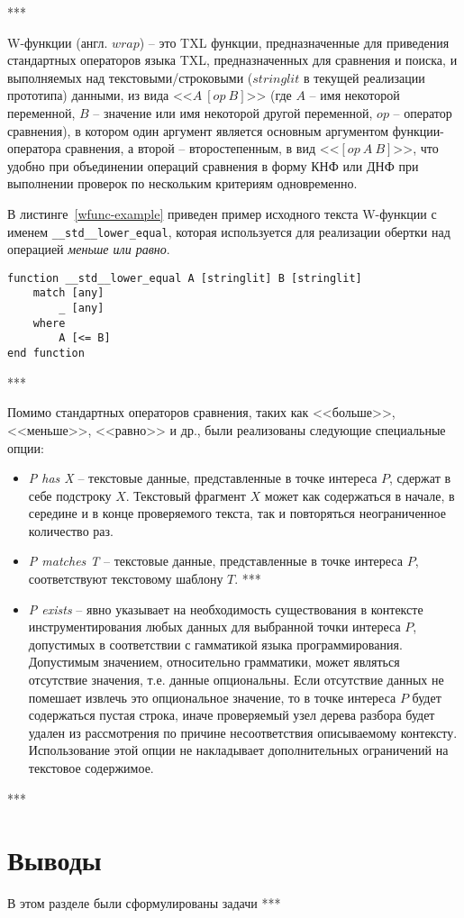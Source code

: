 ***

W-функции (англ. $wrap$) -- это TXL функции, предназначенные для приведения стандартных операторов языка TXL, предназначенных для сравнения и поиска, и выполняемых над текстовыми/строковыми ($stringlit$ в текущей реализации прототипа) данными, из вида <<$A~[op~B]$>> (где $A$ -- имя некоторой переменной, $B$ -- значение или имя некоторой другой переменной, $op$ -- оператор сравнения), в котором один аргумент является основным аргументом функции-оператора сравнения, а второй -- второстепенным, в вид <<$[op~A~B]$>>, что удобно при объединении операций сравнения в форму КНФ или ДНФ при выполнении проверок по нескольким критериям одновременно.

В листинге~\ref{wfunc-example} приведен пример исходного текста W-функции с именем \lstinline{__std__lower_equal}, которая используется для реализации обертки над операцией \textit{меньше или равно}.

\begin{lstlisting}[frame=single, language=TXL, label={wfunc-example}, caption={Пример W-функции}]
function __std__lower_equal A [stringlit] B [stringlit]
	match [any]
		_ [any]
	where
		A [<= B]
end function
\end{lstlisting}

***

Помимо стандартных операторов сравнения, таких как <<больше>>, <<меньше>>, <<равно>> и др., были реализованы следующие специальные опции:
\begin{itemize}[noitemsep]
  \item \textit{P has X} --
  текстовые данные, представленные в точке интереса $P$, сдержат в себе подстроку $X$. Текстовый фрагмент $X$ может как содержаться в начале, в середине и в конце проверяемого текста, так и повторяться неограниченное количество раз.

  \item \textit{P matches T} --
  текстовые данные, представленные в точке интереса $P$, соответствуют текстовому шаблону $T$. ***

  \item \textit{P exists} --
  явно указывает на необходимость существования в контексте инструментирования любых данных для выбранной точки интереса $P$, допустимых в соответствии с гамматикой языка программирования. Допустимым значением, относительно грамматики, может являться отсутствие значения, т.е. данные опциональны. Если отсутствие данных не помешает извлечь это опциональное значение, то в точке интереса $P$ будет содержаться пустая строка, иначе проверяемый узел дерева разбора будет удален из рассмотрения по причине несоответствия описываемому контексту. Использование этой опции не накладывает дополнительных ограничений на текстовое содержимое.
\end{itemize}

***

\section{Выводы}

В этом разделе были сформулированы задачи
***
